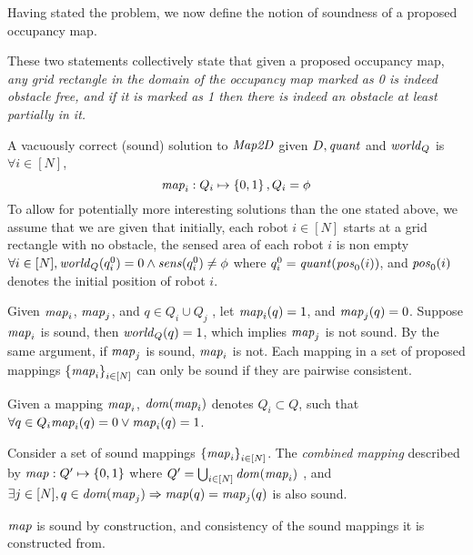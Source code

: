 
Having stated the problem, we now define the notion of soundness of a proposed occupancy map.
\begin{definition}
    \label{soundness}
   
\end{definition}


These two statements collectively state that given a proposed occupancy map, \emph{any grid rectangle in the domain of the occupancy map marked as 0 is indeed obstacle free, and if it is marked as 1 then there is indeed an obstacle at least partially in it.}



A vacuously correct (sound) solution to $\mathit{Map2D}$ given $D, \mathit{quant}$ and $\mathit{world}_Q$ is $\forall i \in [N]$, $$\mathit{map}_i : Q_i \mapsto \left\{0,1\right\}, Q_i = \phi$$ To allow for potentially more interesting solutions than the one stated above, we assume that we are given that initially, each robot $i\in[N]$ starts at a grid rectangle with no obstacle, the sensed area of each robot $i$ is non empty
$\forall i \in [N], \mathit{world}_Q(q^0_i) = 0\wedge \mathit{sens}(q^0_i) \neq \phi$
where $q^0_i = \mathit{quant}(\mathit{pos}_0(i))$, and $\mathit{pos}_0(i)$ denotes the initial position of robot $i$.

%

    Given $\mathit{map}_i$, $\mathit{map}_j$, and $q\in Q_i \cup Q_j$ , let $\mathit{map}_i(q) = 1$, and $\mathit{map}_j(q) = 0$. Suppose $\mathit{map}_i$ is sound, then $\mathit{world}_Q(q) = 1$, which implies $\mathit{map}_j$ is not sound. By the same argument, if $\mathit{map}_j$ is sound, $\mathit{map}_i$ is not. Each mapping in a set of proposed mappings $\left\{\mathit{map}_i\right\}_{i\in [N]}$ can only be sound if they are pairwise consistent.

Given a mapping $\mathit{map}_i$, $\mathit{dom}(\mathit{map}_i)$ denotes $ Q_i \subset Q$, such that $\forall q \in Q_i \mathit{map}_i(q) = 0 \vee \mathit{map}_i(q) = 1$.
\begin{definition}
    \label{cons}
Consider a set of sound mappings $\left\{\mathit{map}_i\right\}_{i\in[N]}$. The \emph{ combined mapping} described by $\mathit{map}: Q^\prime \mapsto \left\{0,1\right\}$ where $Q^\prime = \bigcup_{i\in[N]} \mathit{dom}(\mathit{map}_i)$ , and $\exists j \in [N], q\in \mathit{dom}(\mathit{map}_j)\Rightarrow \mathit{map}(q) = \mathit{map}_j(q)$ is also sound.
\end{definition}

$\mathit{map}$ is sound by construction, and consistency of the sound mappings it is constructed from.
